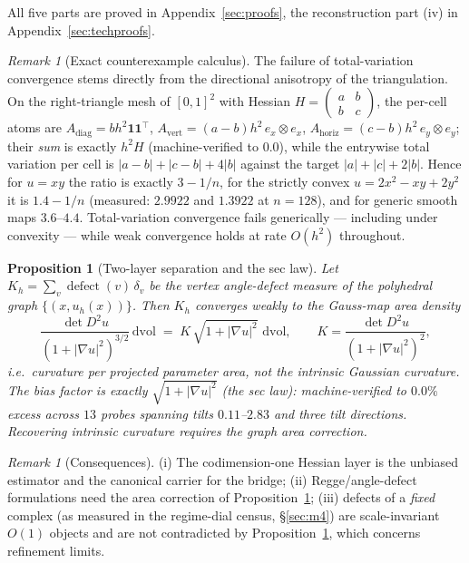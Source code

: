 \documentclass[11pt,a4paper]{article}
\theoremstyle{plain}
\newtheorem{proposition}[theorem]{Proposition}
\theoremstyle{definition}
\theoremstyle{remark}
\newtheorem{remark}[theorem]{Remark}
\newcommand{\dvol}{\,\mathrm{dvol}}
\begin{document}
All five parts are proved in Appendix~\ref{sec:proofs}, the
reconstruction part (iv) in Appendix~\ref{sec:techproofs}.

\begin{remark}[Exact counterexample calculus]\label{rem:tvcounter}
The failure of total-variation convergence stems directly from the
directional anisotropy of the triangulation. On the right-triangle mesh of $[0,1]^2$ with Hessian
$H = \left(\begin{smallmatrix} a & b\\ b & c\end{smallmatrix}\right)$, the
per-cell atoms are $A_{\mathrm{diag}} = b h^2 \mathbf{1}\mathbf{1}^\top$,
$A_{\mathrm{vert}} = (a-b) h^2\, e_x \otimes e_x$,
$A_{\mathrm{horiz}} = (c-b) h^2\, e_y \otimes e_y$; their \emph{sum} is
exactly $h^2 H$ (machine-verified to $0.0$), while the entrywise total
variation per cell is $|a-b| + |c-b| + 4|b|$ against the target
$|a| + |c| + 2|b|$. Hence for $u = xy$ the ratio is exactly $3 - 1/n$, for
the strictly convex $u = 2x^2 - xy + 2y^2$ it is $1.4 - 1/n$ (measured:
$2.9922$ and $1.3922$ at $n=128$), and for generic smooth maps $3.6$--$4.4$.
Total-variation convergence fails generically --- including under
convexity --- while weak convergence holds at rate $O(h^2)$ throughout.
\end{remark}

\begin{proposition}[Two-layer separation and the sec law]
\label{prop:seclaw}
Let $K_h = \sum_v \operatorname{defect}(v)\,\delta_v$ be the vertex
angle-defect measure of the polyhedral graph
$\{(x, u_h(x))\}$. Then $K_h$ converges weakly to the \emph{Gauss-map area
density}
\[
\frac{\det D^2 u}{\left(1 + |\nabla u|^2\right)^{3/2}} \dvol
\;=\; K\,\sqrt{1+|\nabla u|^2}\,\dvol,
\qquad
K = \frac{\det D^2 u}{(1+|\nabla u|^2)^2},
\]
i.e.\ curvature per projected parameter area, \emph{not} the intrinsic
Gaussian curvature. The bias factor is exactly
$\sqrt{1+|\nabla u|^2}$ (the sec law): machine-verified to $0.0\%$ excess
across $13$ probes spanning tilts $0.11$--$2.83$ and three tilt
directions. Recovering intrinsic curvature requires the graph area
correction.
\end{proposition}

\begin{remark}[Consequences]
(i) The codimension-one Hessian layer is the unbiased estimator and the
canonical carrier for the bridge; (ii) Regge/angle-defect formulations
need the area correction of Proposition~\ref{prop:seclaw}; (iii) defects
of a \emph{fixed} complex (as measured in the regime-dial census, \S\ref{sec:m4}) are
scale-invariant $O(1)$ objects and are not contradicted by
Proposition~\ref{prop:seclaw}, which concerns refinement limits.
\end{remark}
\end{document}

